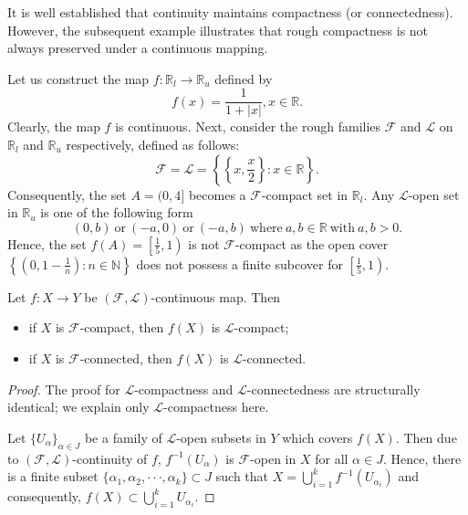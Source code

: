 \documentclass[11pt]{amsart}
\begin{document}
It is well established that continuity maintains compactness (or connectedness). However, the subsequent example illustrates that rough compactness is not always preserved under a continuous mapping.

\begin{example}
    Let us construct the map $f: \mathbb{R}_l\to \mathbb{R}_u$ defined by $$f(x)=\frac{1}{1+|x|}, x\in \mathbb{R}.$$
    Clearly, the map $f$ is continuous. Next, consider the rough families $\mathscr{F}$ and $\mathscr{L}$ on $\mathbb{R}_l$ and $\mathbb{R}_u$ respectively, defined as follows: 
    $$\mathscr{F}=\mathscr{L}=\left\{\left\{x,\frac{x}{2}\right\}:x\in \mathbb{R}\right\}.$$ Consequently, the set $A=(0,4]$ becomes a $\mathscr{F}$-compact set in $\mathbb{R}_l$. Any $\mathscr{L}$-open set in $\mathbb{R}_u$ is one of the following form 
    $$(0,b)~\text{or}~(-a,0)~\text{or}~(-a,b)~\text{where}~a,b\in \mathbb{R}~\text{with}~a,b>0.$$
    Hence, the set $f(A)=\left[\frac{1}{5},1\right)$ is not $\mathscr{F}$-compact as the open cover $\left\{\left(0,1-\frac{1}{n}\right):n\in\mathbb{N}\right\}$  does not possess a finite subcover for $\left[\frac{1}{5},1\right)$.
\end{example}


\begin{theorem}\label{Thm6.1}
     Let $f: X\rightarrow Y$ be $(\mathscr{F},\mathscr{L})$-continuous map. Then \begin{itemize}
         \item[(i)] if $X$ is $\mathscr{F}$-compact, then $f(X)$ is $\mathscr{L}$-compact;

         \item[(ii)] if $X$ is $\mathscr{F}$-connected, then $f(X)$ is $\mathscr{L}$-connected.
     \end{itemize}
\end{theorem}

\begin{proof} The proof for $\mathscr{L}$-compactness and $\mathscr{L}$-connectedness are structurally identical; we explain only $\mathscr{L}$-compactness here.


    Let $\{U_\alpha\}_{\alpha\in J}$ be a family of $\mathscr{L}$-open subsets in $Y$ which covers $f(X)$. Then due to $(\mathscr{F},\mathscr{L})$-continuity of $f$, $f^{-1}(U_\alpha)$ is $\mathscr{F}$-open in $X$ for all $\alpha\in J$. Hence, there is a finite subset $\{\alpha_1,\alpha_2,\cdot\cdot\cdot,\alpha_k\}\subset J$ such that $X=\bigcup^{k}_{i=1}f^{-1}(U_{\alpha_i})$ and consequently, $f(X)\subset \bigcup^{k}_{i=1}U_{\alpha_i}$.
\end{proof}
\end{document}
